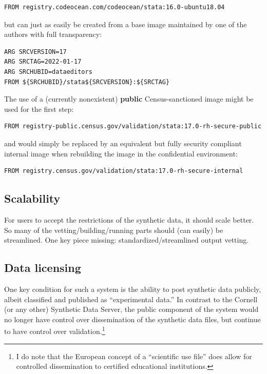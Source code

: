 \documentclass[]{hdsr}
\begin{document}
\begin{lstlisting}[language=docker]
FROM registry.codeocean.com/codeocean/stata:16.0-ubuntu18.04
\end{lstlisting}

\noindent but can just as easily be created from a base image maintained by one of the authors with full transparency:

\begin{lstlisting}[language=docker]
ARG SRCVERSION=17
ARG SRCTAG=2022-01-17
ARG SRCHUBID=dataeditors
FROM ${SRCHUBID}/stata${SRCVERSION}:${SRCTAG}
\end{lstlisting}

\noindent The use of a  (currently nonexistent) \textbf{public}  Census-sanctioned image might be used for the first step:

\begin{lstlisting}[language=docker]
FROM registry-public.census.gov/validation/stata:17.0-rh-secure-public
\end{lstlisting}

\noindent and would simply be replaced by an equivalent but fully security compliant internal image when rebuilding the image in the confidential environment:

\begin{lstlisting}[language=docker]
FROM registry.census.gov/validation/stata:17.0-rh-secure-internal
\end{lstlisting}



\subsection{Scalability}

For users to accept the restrictions of the synthetic data, it should scale better. So many of the vetting/building/running parts should (can easily) be streamlined. One key piece missing: standardized/streamlined output vetting.

\subsection{Data licensing}

One key condition for such a system is the ability to post synthetic data publicly, albeit  classified and published as ``experimental data.'' In contrast to the Cornell (or any other) Synthetic Data Server, the public component of the system would no longer have control over dissemination of the synthetic data files, but continue to have control over validation.\footnote{I do note that the European concept of a ``scientific use file'' does allow for controlled dissemination to certified educational institutions.}
\end{document}
